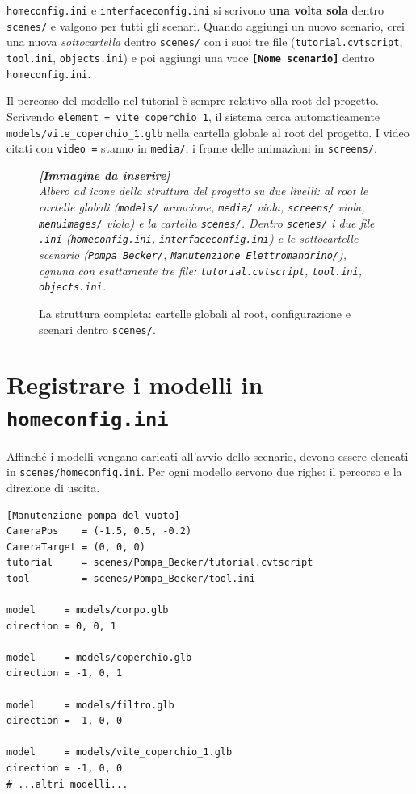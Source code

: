 ﻿\documentclass[a4paper,12pt,oneside]{book}
\newcommand{\kw}[1]{\texttt{\color{keycolor}#1}}
\newcommand{\sez}[1]{\texttt{\color{sectioncolor}\textbf{#1}}}
\newcommand{\file}[1]{\texttt{#1}}
\newcommand{\imgph}[2]{%
  \begin{tcolorbox}[colback=cvtlightblue!30,colframe=cvtblue!40,%
    width=#1,halign=center,valign=center,height=5cm,boxrule=0.5pt,arc=3pt]%
    \textcolor{cvtgray}{\itshape\footnotesize\textbf{[Immagine da inserire]}\\[3pt]#2}%
  \end{tcolorbox}}
\begin{document}
\begin{notablu}
\file{homeconfig.ini} e \file{interfaceconfig.ini} si scrivono \textbf{una
volta sola} dentro \file{scenes/} e valgono per tutti gli scenari. Quando
aggiungi un nuovo scenario, crei una nuova \emph{sottocartella} dentro
\file{scenes/} con i suoi tre file (\file{tutorial.cvtscript},
\file{tool.ini}, \file{objects.ini}) e poi aggiungi una voce
\sez{[Nome scenario]} dentro \file{homeconfig.ini}.
\end{notablu}

\begin{notablu}
Il percorso del modello nel tutorial è sempre relativo alla root del
progetto. Scrivendo \texttt{element = vite\_coperchio\_1}, il sistema
cerca automaticamente \file{models/vite\_coperchio\_1.glb} nella cartella
globale al root del progetto. I video citati con \kw{video =} stanno in
\file{media/}, i frame delle animazioni in \file{screens/}.
\end{notablu}

\begin{figure}[H]
  \centering
  \imgph{12cm}{Albero ad icone della struttura del progetto su due livelli: al root le cartelle globali (\file{models/} arancione, \file{media/} viola, \file{screens/} viola, \file{menuimages/} viola) e la cartella \file{scenes/}. Dentro \file{scenes/} i due file \file{.ini} (\file{homeconfig.ini}, \file{interfaceconfig.ini}) e le sottocartelle scenario (\file{Pompa\_Becker/}, \file{Manutenzione\_Elettromandrino/}), ognuna con esattamente tre file: \file{tutorial.cvtscript}, \file{tool.ini}, \file{objects.ini}.}
  \caption{La struttura completa: cartelle globali al root, configurazione e scenari dentro \file{scenes/}.}
  \label{fig:struttura-cartelle}
\end{figure}

\section{Registrare i modelli in \texttt{homeconfig.ini}}

Affinché i modelli vengano caricati all'avvio dello scenario, devono
essere elencati in \file{scenes/homeconfig.ini}. Per ogni modello
servono due righe: il percorso e la direzione di uscita.

\begin{esempiocvt}
\begin{lstlisting}
[Manutenzione pompa del vuoto]
CameraPos    = (-1.5, 0.5, -0.2)
CameraTarget = (0, 0, 0)
tutorial     = scenes/Pompa_Becker/tutorial.cvtscript
tool         = scenes/Pompa_Becker/tool.ini

model     = models/corpo.glb
direction = 0, 0, 1

model     = models/coperchio.glb
direction = -1, 0, 1

model     = models/filtro.glb
direction = -1, 0, 0

model     = models/vite_coperchio_1.glb
direction = -1, 0, 0
# ...altri modelli...
\end{lstlisting}
\end{esempiocvt}
\end{document}
